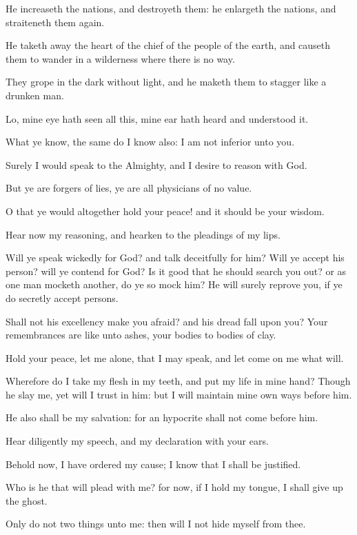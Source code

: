 \Verse He increaseth the nations, and destroyeth them: he enlargeth the nations, and straiteneth them again.

\Verse He taketh away the heart of the chief of the people of the earth, and causeth them to wander in a wilderness where there is no way.

\Verse They grope in the dark without light, and he maketh them to stagger like a drunken man.


\Chapter
\Verse Lo, mine eye hath seen all this, mine ear hath heard and understood it.

\Verse What ye know, the same do I know also: I am not inferior unto you.

\Verse Surely I would speak to the Almighty, and I desire to reason with God.

\Verse But ye are forgers of lies, ye are all physicians of no value.

\Verse O that ye would altogether hold your peace! and it should be your wisdom.

\Verse Hear now my reasoning, and hearken to the pleadings of my lips.

\Verse Will ye speak wickedly for God? and talk deceitfully for him?  \Verse Will ye accept his person? will ye contend for God?  \Verse Is it good that he should search you out? or as one man mocketh another, do ye so mock him?  \Verse He will surely reprove you, if ye do secretly accept persons.

\Verse Shall not his excellency make you afraid? and his dread fall upon you?  \Verse Your remembrances are like unto ashes, your bodies to bodies of clay.

\Verse Hold your peace, let me alone, that I may speak, and let come on me what will.

\Verse Wherefore do I take my flesh in my teeth, and put my life in mine hand?  \Verse Though he slay me, yet will I trust in him: but I will maintain mine own ways before him.

\Verse He also shall be my salvation: for an hypocrite shall not come before him.

\Verse Hear diligently my speech, and my declaration with your ears.

\Verse Behold now, I have ordered my cause; I know that I shall be justified.

\Verse Who is he that will plead with me? for now, if I hold my tongue, I shall give up the ghost.

\Verse Only do not two things unto me: then will I not hide myself from thee.

